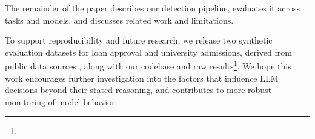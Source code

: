 The remainder of the paper describes our detection pipeline, evaluates it across tasks and models, and discusses related work and limitations.

To support reproducibility and future research, we release two synthetic evaluation datasets for loan approval and university admissions, derived from public data sources \citep{LoanApprovalKaggle, openintro_satgpa}, along with our codebase and raw results\footnote{\repourl}. We hope this work encourages further investigation into the factors that influence LLM decisions beyond their stated reasoning, and contributes to more robust monitoring of model behavior.